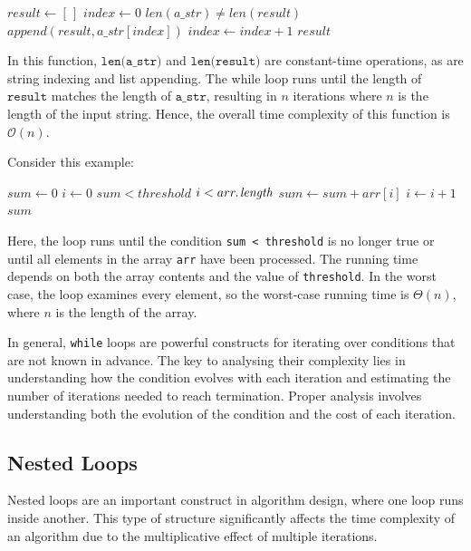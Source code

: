 \begin{codebox}
    \li $result \gets [\,]$ 
    \li $index \gets 0$
    \li \While $len(a\_str) \neq len(result)$ \Do
    \li     $append(result, a\_str[index])$
    \li     $index \gets index + 1$
        \End
    \li \Return $result$
\end{codebox}

In this function, $\texttt{len(a\_str)}$ and $\texttt{len(result)}$ are constant-time operations, as are string indexing and list appending. The while loop runs until the length of $\texttt{result}$ matches the length of $\texttt{a\_str}$, resulting in $n$ iterations where $n$ is the length of the input string. Hence, the overall time complexity of this function is $\mathcal{O}(n)$.

Consider this example:

\begin{codebox}
    \li $sum \gets 0$
    \li $i \gets 0$
    \li \While $sum < threshold$  $i < \attrib{arr}{length}$ \Do
    \li     $sum \gets sum + arr[i]$
    \li     $i \gets i + 1$
        \End
    \li \Return $sum$
\end{codebox}

Here, the loop runs until the condition \texttt{sum < threshold} is no longer true or until all elements in the array \texttt{arr} have been processed. The running time depends on both the array contents and the value of \texttt{threshold}. In the worst case, the loop examines every element, so the worst-case running time is $\Theta(n)$, where $n$ is the length of the array.

In general, \texttt{while} loops are powerful constructs for iterating over conditions that are not known in advance. The key to analysing their complexity lies in understanding how the condition evolves with each iteration and estimating the number of iterations needed to reach termination. Proper analysis involves understanding both the evolution of the condition and the cost of each iteration.

\subsection*{Nested Loops}

Nested loops are an important construct in algorithm design, where one loop runs inside another. This type of structure significantly affects the time complexity of an algorithm due to the multiplicative effect of multiple iterations.



